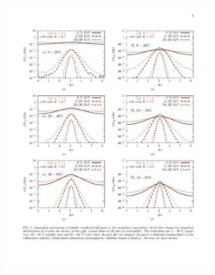 \begin{figure}[htbp]
	\begin{center}
    \begin{subfigure}{0.75\textwidth}
        \includegraphics[width=\textwidth]{Plots/Intro/cc_cent.pdf}
        \caption{}
        \label{fig:ccbarcent}
    \end{subfigure}
    \begin{subfigure}{0.75\textwidth}

\end{subfigure}
\end{center}
\end{figure}
